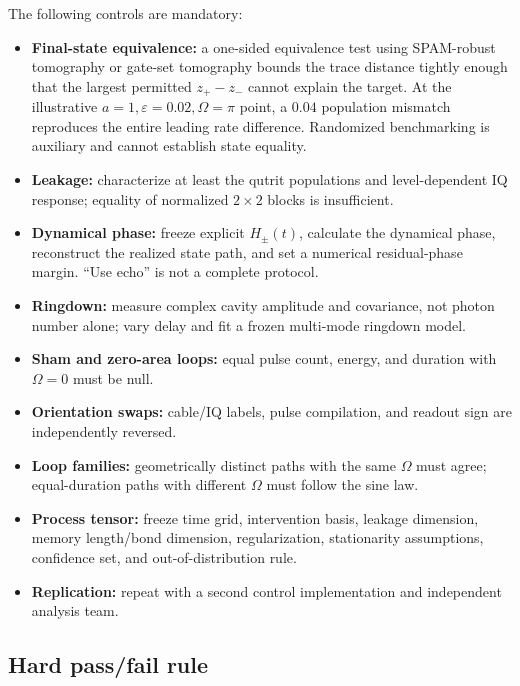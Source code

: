 \documentclass[10pt]{article}
\theoremstyle{definition}
\theoremstyle{remark}
\begin{document}
The following controls are mandatory:
\begin{itemize}
\item \textbf{Final-state equivalence:} a one-sided equivalence test using SPAM-robust tomography or gate-set tomography bounds the trace distance tightly enough that the largest permitted \(z_+-z_-\) cannot explain the target. At the illustrative \(a=1,\varepsilon=0.02,\Omega=\pi\) point, a \(0.04\) population mismatch reproduces the entire leading rate difference. Randomized benchmarking is auxiliary and cannot establish state equality.
\item \textbf{Leakage:} characterize at least the qutrit populations and level-dependent IQ response; equality of normalized \(2\times2\) blocks is insufficient.
\item \textbf{Dynamical phase:} freeze explicit \(H_\pm(t)\), calculate the dynamical phase, reconstruct the realized state path, and set a numerical residual-phase margin. ``Use echo'' is not a complete protocol.
\item \textbf{Ringdown:} measure complex cavity amplitude and covariance, not photon number alone; vary delay and fit a frozen multi-mode ringdown model.
\item \textbf{Sham and zero-area loops:} equal pulse count, energy, and duration with \(\Omega=0\) must be null.
\item \textbf{Orientation swaps:} cable/IQ labels, pulse compilation, and readout sign are independently reversed.
\item \textbf{Loop families:} geometrically distinct paths with the same \(\Omega\) must agree; equal-duration paths with different \(\Omega\) must follow the sine law.
\item \textbf{Process tensor:} freeze time grid, intervention basis, leakage dimension, memory length/bond dimension, regularization, stationarity assumptions, confidence set, and out-of-distribution rule.
\item \textbf{Replication:} repeat with a second control implementation and independent analysis team.
\end{itemize}

\subsection{Hard pass/fail rule}
\end{document}
